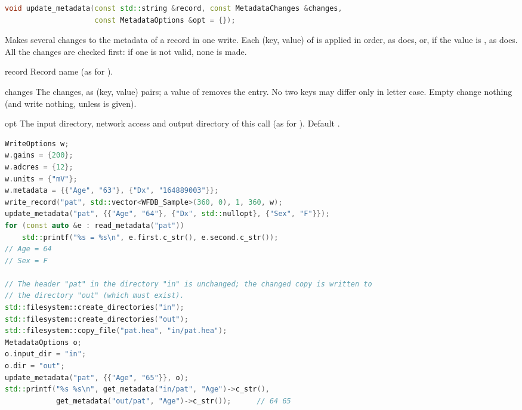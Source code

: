 \begin{lstlisting}[language=C++,style=signature]
void update_metadata(const std::string &record, const MetadataChanges &changes,
                     const MetadataOptions &opt = {});
\end{lstlisting}
Makes several changes to the metadata of a record in one write. Each (key, value) of
 is applied in order, as  does, or, if the value is
, as  does. All the changes are checked first:
if one is not valid, none is made.
\begin{params}
\item[record] Record name (as for ).
\item[changes] The changes, as (key, value) pairs; a value of  removes
  the entry. No two keys may differ only in letter case. Empty  change
  nothing (and write nothing, unless  is given).
\item[opt] The input directory, network access and output directory  of this
  call (as for ). Default \code{\{\}}.
\end{params}
\begin{lstlisting}[language=C++,style=example]
WriteOptions w;
w.gains = {200};
w.adcres = {12};
w.units = {"mV"};
w.metadata = {{"Age", "63"}, {"Dx", "164889003"}};
write_record("pat", std::vector<WFDB_Sample>(360, 0), 1, 360, w);
update_metadata("pat", {{"Age", "64"}, {"Dx", std::nullopt}, {"Sex", "F"}});
for (const auto &e : read_metadata("pat"))
    std::printf("%s = %s\n", e.first.c_str(), e.second.c_str());
// Age = 64
// Sex = F

// The header "pat" in the directory "in" is unchanged; the changed copy is written to
// the directory "out" (which must exist).
std::filesystem::create_directories("in");
std::filesystem::create_directories("out");
std::filesystem::copy_file("pat.hea", "in/pat.hea");
MetadataOptions o;
o.input_dir = "in";
o.dir = "out";
update_metadata("pat", {{"Age", "65"}}, o);
std::printf("%s %s\n", get_metadata("in/pat", "Age")->c_str(),
            get_metadata("out/pat", "Age")->c_str());      // 64 65
\end{lstlisting}

